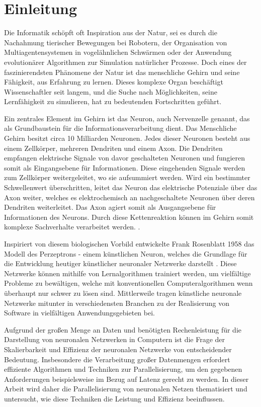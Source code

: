 \chapter{Einleitung}
\label{ch:Einleitung}

Die Informatik schöpft oft Inspiration aus der Natur, sei es durch die Nachahmung tierischer Bewegungen bei Robotern, der Organisation von Multiagentensystemen in vogelähnlichen Schwärmen oder der Anwendung evolutionärer Algorithmen zur Simulation natürlicher Prozesse. Doch eines der faszinierendsten Phänomene der Natur ist das menschliche Gehirn und seine Fähigkeit, aus Erfahrung zu lernen. Dieses komplexe Organ beschäftigt Wissenschaftler seit langem, und die Suche nach Möglichkeiten, seine Lernfähigkeit zu simulieren, hat zu bedeutenden Fortschritten geführt.

Ein zentrales Element im Gehirn ist das Neuron, auch Nervenzelle genannt, das als Grundbaustein für die Informationsverarbeitung dient. Das Menschliche Gehirn besitzt circa 10 Milliarden Neuronen. Jedes dieser Neuronen besteht aus einem Zellkörper, mehreren Dendriten und einem Axon. Die Dendriten empfangen elektrische Signale von davor geschalteten Neuronen und fungieren somit als Eingangsebene für Informationen. Diese eingehenden Signale werden zum Zellkörper weitergeleitet, wo sie aufsummiert werden. Wird ein bestimmter Schwellenwert überschritten, leitet das Neuron das elektrische Potenziale über das Axon weiter, welches es elektrochemisch an nachgeschaltete Neuronen über deren Dendriten weiterleitet. Das Axon agiert somit als Ausgangsebene für Informationen des Neurons. 
Durch diese Kettenreaktion können im Gehirn somit komplexe Sachverhalte verarbeitet werden. \citep{Praktische_Einfuhrung_in_neuronale_Netze}.

Inspiriert von diesem biologischen Vorbild entwickelte Frank Rosenblatt 1958 das Modell des Perzeptrons - einem künstlichen Neuron, welches die Grundlage für die Entwicklung heutiger künstlicher neuronaler Netzwerke darstellt \citep{Rosenblatt_Perceptron}. Diese Netzwerke können mithilfe von Lernalgorithmen trainiert werden, um vielfältige Probleme zu bewältigen, welche mit konventionellen Computeralgorithmen wenn überhaupt nur schwer zu lösen sind. Mittlerweile tragen künstliche neuronale Netzwerke mitunter in verschiedensten Branchen zu der Realisierung von Software in vielfältigen Anwendungsgebieten bei.

Aufgrund der großen Menge an Daten und benötigten Rechenleistung für die Darstellung von neuronalen Netzwerken in Computern ist die Frage der Skalierbarkeit und Effizienz der neuronalen Netzwerke von entscheidender Bedeutung. Insbesondere die Verarbeitung großer Datenmengen erfordert effiziente Algorithmen und Techniken zur Parallelisierung, um den gegebenen Anforderungen beispielsweise im Bezug auf Latenz gerecht zu werden. In dieser Arbeit wird daher die Parallelisierung von neuronalen Netzen thematisiert und untersucht, wie diese Techniken die Leistung und Effizienz beeinflussen.


